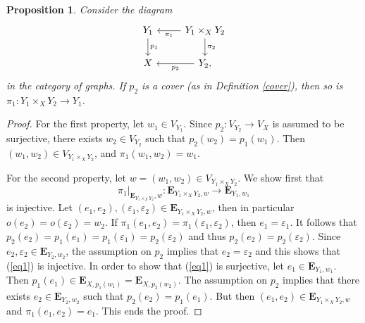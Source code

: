 \documentclass[11pt]{amsart}
\newtheorem{proposition}[theorem]{Proposition}
\numberwithin{equation}{section}
\theoremstyle{remark}
\begin{document}
\begin{proposition} \label{cover_preserve}
Consider the diagram
\begin{equation*}
\begin{tikzcd}
Y_{1} \arrow["p_{1}",d] &\arrow["\pi_{1}",l] \arrow["\pi_{2}",d] Y_{1} \times_{X}Y_{2}  \\
X & \arrow["p_{2}",l] Y_{2},
\end{tikzcd}
\end{equation*}
in the category of graphs.  If $p_{2}$ is a cover (as in Definition \ref{cover}), then so is $\pi_{1}:Y_{1}\times_{X}Y_{2} \rightarrow Y_{1}$.
\end{proposition}
\begin{proof}
For the first property, let $w_{1} \in V_{Y_{1}}$.  Since $p_{2}:V_{Y_{2}} \rightarrow V_{X}$ is assumed to be surjective, there exists $w_{2} \in V_{Y_{2}}$ such that $p_{2}(w_{2}) = p_{1}(w_{1})$.  Then $(w_{1},w_{2}) \in V_{Y_{1}\times_{X}Y_{2}}$, and $\pi_{1}(w_{1},w_{2})=w_{1}$.

For the second property, let $w = (w_{1},w_{2}) \in V_{Y_{1}\times_{X}Y_{2}}$.  We show first that
\begin{equation} \label{eq1}
\pi_{1}|_{\mathbf{E}_{Y_{1}\times_{X}Y_{2}},w}:\mathbf{E}_{Y_{1}\times_{X}Y_{2},w} \rightarrow \mathbf{E}_{Y_{1},w_{1}}
\end{equation}
is injective.  Let $(e_{1},e_{2}), (\varepsilon_{1},\varepsilon_{2}) \in \mathbf{E}_{Y_{1}\times_{X}Y_{2},w}$, then in particular $o(e_{2}) = o(\varepsilon_{2}) = w_{2}$.  If $\pi_{1}(e_{1},e_{2}) = \pi_{1}(\varepsilon_{1},\varepsilon_{2})$, then $e_{1} = \varepsilon_{1}$.  It follows that $p_{2}(e_{2}) = p_{1}(e_{1}) = p_{1}(\varepsilon_{1}) = p_{2}(\varepsilon_{2})$ and thus $p_{2}(e_{2}) = p_{2}(\varepsilon_{2})$.  Since $e_{2},\varepsilon_{2} \in \mathbf{E}_{Y_{2},w_{2}}$, the assumption on $p_{2}$ implies that $e_{2} = \varepsilon_{2}$ and this shows that (\ref{eq1}) is injective.  In order to show that (\ref{eq1}) is surjective, let $e_{1} \in \mathbf{E}_{Y_{1},w_{1}}$.  Then $p_{1}(e_{1}) \in \mathbf{E}_{X,p_{1}(w_{1})} = \mathbf{E}_{X,p_{2}(w_{2})}$.  The assumption on $p_{2}$ implies that there exists $e_{2} \in \mathbf{E}_{Y_{2},w_{2}}$ such that $p_{2}(e_{2}) = p_{1}(e_{1})$.  But then $(e_{1},e_{2}) \in \mathbf{E}_{Y_{1}\times_{X}Y_{2},w}$ and $\pi_{1}(e_{1},e_{2}) = e_{1}$.  This ends the proof.
\end{proof}
\end{document}

